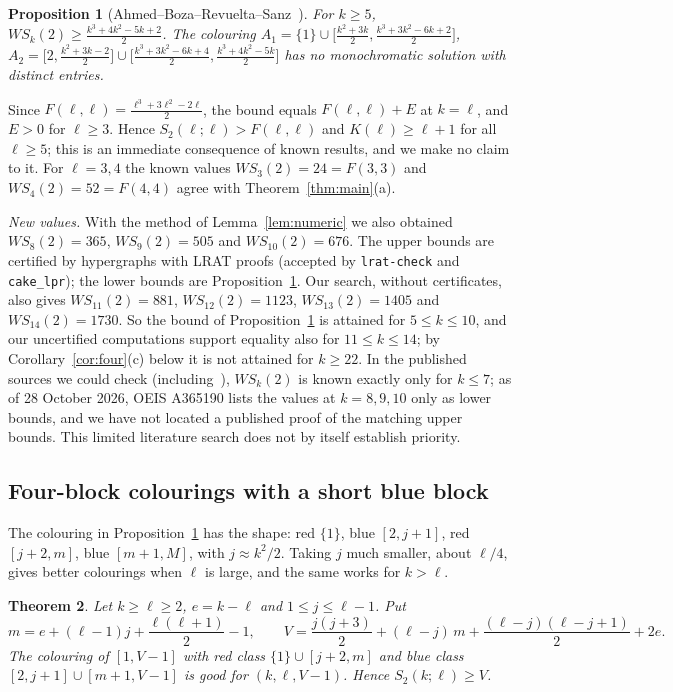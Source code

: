 \documentclass[11pt]{amsart}
\newtheorem{theorem}{Theorem}
\newtheorem{proposition}[theorem]{Proposition}
\theoremstyle{definition}
\newcommand{\F}{F}
\newcommand{\Stwo}{S_2}
\begin{document}
\begin{proposition}[Ahmed--Boza--Revuelta--Sanz~{\cite[Lemma~2.1]{ABRS}}]\label{prop:ahmed}
For $k\ge5$, $WS_k(2)\ge\frac{k^3+4k^2-5k+2}{2}$. The colouring $A_1=\{1\}\cup\bigl[\tfrac{k^2+3k}{2},\tfrac{k^3+3k^2-6k+2}{2}\bigr]$, $A_2=\bigl[2,\tfrac{k^2+3k-2}{2}\bigr]\cup\bigl[\tfrac{k^3+3k^2-6k+4}{2},\tfrac{k^3+4k^2-5k}{2}\bigr]$ has no monochromatic solution with distinct entries.
\end{proposition}

\noindent Since $\F(\ell,\ell)=\frac{\ell^3+3\ell^2-2\ell}{2}$, the bound equals $\F(\ell,\ell)+E$ at $k=\ell$, and $E>0$ for $\ell\ge3$. Hence $\Stwo(\ell;\ell)>\F(\ell,\ell)$ and $K(\ell)\ge\ell+1$ for all $\ell\ge5$; this is an immediate consequence of known results, and we make no claim to it. For $\ell=3,4$ the known values $WS_3(2)=24=\F(3,3)$ and $WS_4(2)=52=\F(4,4)$ agree with Theorem~\ref{thm:main}(a).

\noindent\emph{New values.} With the method of Lemma~\ref{lem:numeric} we also obtained $WS_8(2)=365$, $WS_9(2)=505$ and $WS_{10}(2)=676$. The upper bounds are certified by hypergraphs with LRAT proofs (accepted by \texttt{lrat-check} and \texttt{cake\_lpr}); the lower bounds are Proposition~\ref{prop:ahmed}. Our search, without certificates, also gives $WS_{11}(2)=881$, $WS_{12}(2)=1123$, $WS_{13}(2)=1405$ and $WS_{14}(2)=1730$. So the bound of Proposition~\ref{prop:ahmed} is attained for $5\le k\le 10$, and our uncertified computations support equality also for $11\le k\le14$; by Corollary~\ref{cor:four}(c) below it is not attained for $k\ge22$. In the published sources we could check (including~\cite{ABRS2}), $WS_k(2)$ is known exactly only for $k\le7$; as of 28 October 2026, OEIS A365190 lists the values at $k=8,9,10$ only as lower bounds, and we have not located a published proof of the matching upper bounds. This limited literature search does not by itself establish priority.

\subsection*{Four-block colourings with a short blue block} The colouring in Proposition~\ref{prop:ahmed} has the shape: red $\{1\}$, blue $[2,j+1]$, red $[j+2,m]$, blue $[m+1,M]$, with $j\approx k^2/2$. Taking $j$ much smaller, about $\ell/4$, gives better colourings when $\ell$ is large, and the same works for $k>\ell$.

\begin{theorem}\label{thm:four}
Let $k\ge\ell\ge2$, $e=k-\ell$ and $1\le j\le\ell-1$. Put
\[
m=e+(\ell-1)j+\frac{\ell(\ell+1)}{2}-1,\qquad V=\frac{j(j+3)}{2}+(\ell-j)\,m+\frac{(\ell-j)(\ell-j+1)}{2}+2e .
\]
The colouring of $[1,V-1]$ with red class $\{1\}\cup[j+2,m]$ and blue class $[2,j+1]\cup[m+1,V-1]$ is good for $(k,\ell,V-1)$. Hence $\Stwo(k;\ell)\ge V$.
\end{theorem}
\end{document}
